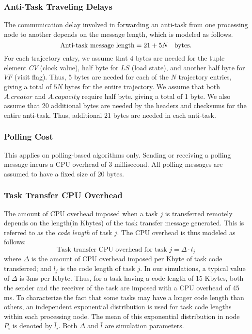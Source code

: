 \subsubsection {Anti-Task Traveling Delays}

The communication delay involved in forwarding an anti-task from
one processing node to another depends on the message length,
which is modeled as follows.
%
\begin{equation}
	\mbox{Anti-task message length}
	= 21 + 5N  \mbox{\hspace{2mm} bytes.}
\end{equation}
%
For each trajectory entry, we assume that 4 bytes are needed for the
tuple element $CV$ (clock value),
half byte for $LS$ (load state), and
another half byte for $VF$ (visit flag).
Thus, 5 bytes are needed for each of the $N$ trajectory entries, 
giving a total of $5N$ bytes for the entire trajectory.
%
We assume that both $A.creator$ and $A.capacity$ require
half byte, giving a total of 1 byte.
%
We also assume that 20 additional bytes are needed 
by the headers and checksums for the entire anti-task. 
Thus, additional 21 bytes are needed in each anti-task.


\subsubsection {Polling Cost}

This applies on polling-based algorithms only.
Sending or receiving a polling message incurs a CPU overhead of 3 millisecond. 
All polling messages are assumed to have a fixed size of 20 bytes.


\subsubsection {Task Transfer CPU Overhead}
%
The amount of CPU overhead imposed when a task $j$ is transferred
remotely depends on the length(in Kbytes) of the task transfer message
generated. This is referred to as the {\it code length\/} of task $j$.
The CPU overhead is thus modeled as follows:
%
\begin{equation}
	\mbox{Task transfer CPU overhead for task $j$}
	= \Delta \cdot l_j
\end{equation}
%
where $\Delta$ is the amount of CPU overhead imposed per Kbyte of
task code transferred; and $l_j$ is the code length of task $j$.
%
In our simulations, a typical value of $\Delta$ is
3ms per Kbyte. Thus, for a task having a code length of 15 Kbytes,
both the sender and the receiver of the task are imposed with a
CPU overhead of 45 ms.
%
To characterize the fact that some tasks may have a longer code length
than others, an independent exponential distribution is used
for task code lengths within each processing node.
The mean of this exponential distribution in node $P_i$ is 
denoted by $\bar{l}_i$. 
Both $\Delta$ and $\bar{l}$ are simulation parameters.
 
